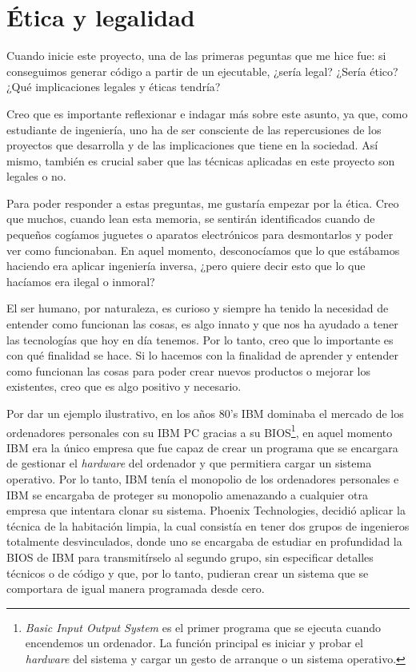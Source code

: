 \section{Ética y legalidad}
\label{sec:etica_legalidad}


Cuando inicie este proyecto, una de las primeras peguntas que me hice fue: si conseguimos
generar código a partir de un ejecutable, ¿sería legal? ¿Sería ético? ¿Qué implicaciones
legales y éticas tendría?

Creo que es importante reflexionar e indagar más sobre este asunto, ya que, como estudiante
de ingeniería, uno ha de ser consciente de las repercusiones de los proyectos que desarrolla y
de las implicaciones que tiene en la sociedad. Así mismo, también es crucial saber que las
técnicas aplicadas en este proyecto son legales o no.

Para poder responder a estas preguntas, me gustaría empezar por la ética. Creo que muchos, cuando
lean esta memoria, se sentirán identificados cuando de pequeños cogíamos juguetes o aparatos electrónicos
para desmontarlos y poder ver como funcionaban. En aquel momento, desconocíamos que lo que estábamos
haciendo era aplicar ingeniería inversa, ¿pero quiere decir esto que lo que hacíamos era ilegal o inmoral?

El ser humano, por naturaleza, es curioso y siempre ha tenido la necesidad de entender como funcionan
las cosas, es algo innato y que nos ha ayudado a tener las tecnologías que hoy en día tenemos. Por lo tanto,
creo que lo importante es con qué finalidad se hace. Si lo hacemos con la finalidad de aprender y entender
como funcionan las cosas para poder crear nuevos productos o mejorar los existentes, creo que es algo
positivo y necesario.

Por dar un ejemplo ilustrativo, en los años 80's IBM dominaba el mercado de los ordenadores personales
con su IBM PC gracias a su BIOS\footnote{\textit{Basic Input Output System} es el primer programa que se
ejecuta cuando encendemos un ordenador. La función principal es iniciar y probar el \textit{hardware}
del sistema y cargar un gesto de arranque o un sistema operativo.}, en aquel momento IBM era la único empresa
que fue capaz de crear un programa que se encargara de gestionar el \textit{hardware} del ordenador y que
permitiera cargar un sistema operativo. Por lo tanto, IBM tenía el monopolio de los ordenadores personales
e IBM se encargaba de proteger su monopolio amenazando a cualquier otra empresa que intentara clonar su sistema.
Phoenix Technologies, decidió aplicar la técnica de la habitación limpia, la cual consistía en tener dos grupos
de ingenieros totalmente desvinculados, donde uno se encargaba de estudiar en profundidad la BIOS de IBM para
transmitírselo al segundo grupo, sin especificar detalles técnicos o de código y que, por lo tanto, pudieran
crear un sistema que se comportara de igual manera programada desde cero.

